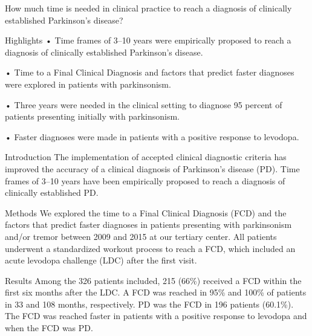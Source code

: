 How much time is needed in clinical practice to reach a diagnosis of clinically established Parkinson's disease?\cite{ROSSI202153}

Highlights
• Time frames of 3–10 years were empirically proposed to reach a diagnosis of clinically established Parkinson's
disease.

• Time to a Final Clinical Diagnosis and factors that predict faster diagnoses were explored in patients with
parkinsonism.

• Three years were needed in the clinical setting to diagnose 95 percent of patients presenting initially with parkinsonism.

• Faster diagnoses were made in patients with a positive response to levodopa.

Introduction
The implementation of accepted clinical diagnostic criteria has improved the accuracy of a clinical diagnosis of
Parkinson's disease (PD). Time frames of 3–10 years have been empirically proposed to reach a diagnosis of
clinically established PD.

Methods
We explored the time to a Final Clinical Diagnosis (FCD) and the factors that predict faster diagnoses in patients
presenting with parkinsonism and/or tremor between 2009 and 2015 at our tertiary center. All patients underwent a
standardized workout process to reach a FCD, which included an acute levodopa challenge (LDC) after the first visit.

Results
Among the 326 patients included, 215 (66\%) received a FCD within the first six months after the LDC. A FCD was
reached in 95\% and 100\% of patients in 33 and 108 months, respectively. PD was the FCD in 196 patients (60.1\%).
The FCD was reached faster in patients with a positive response to levodopa and when the FCD was PD.

